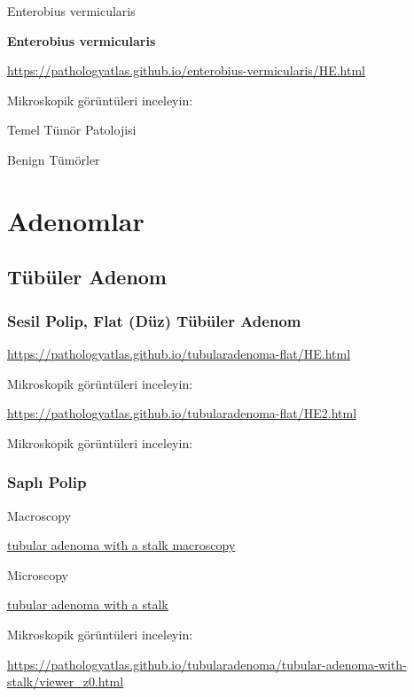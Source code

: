 \documentclass[
  letterpaper,
  DIV=11,
  numbers=noendperiod]{scrreprt}
\begin{document}
Enterobius vermicularis

\textbf{Enterobius vermicularis}

\url{https://pathologyatlas.github.io/enterobius-vermicularis/HE.html}

Mikroskopik görüntüleri inceleyin:

Temel Tümör Patolojisi

Benign Tümörler

\hypertarget{adenomlar}{%
\chapter{Adenomlar}\label{adenomlar}}

\hypertarget{tuxfcbuxfcler-adenom}{%
\section{Tübüler Adenom}\label{tuxfcbuxfcler-adenom}}

\hypertarget{sesil-polip-flat-duxfcz-tuxfcbuxfcler-adenom}{%
\subsection{Sesil Polip, Flat (Düz) Tübüler
Adenom}\label{sesil-polip-flat-duxfcz-tuxfcbuxfcler-adenom}}

\url{https://pathologyatlas.github.io/tubularadenoma-flat/HE.html}

Mikroskopik görüntüleri inceleyin:

\url{https://pathologyatlas.github.io/tubularadenoma-flat/HE2.html}

Mikroskopik görüntüleri inceleyin:

\hypertarget{saplux131-polip}{%
\subsection{Saplı Polip}\label{saplux131-polip}}

Macroscopy

\href{https://pathologyatlas.github.io/tubularadenoma/tubular-adenoma-with-stalk-macroscopy.jpg}{tubular
adenoma with a stalk macroscopy}

Microscopy

\href{https://pathologyatlas.github.io/tubularadenoma/tubular-adenoma-with-stalk.jpeg}{tubular
adenoma with a stalk}

Mikroskopik görüntüleri inceleyin:

\url{https://pathologyatlas.github.io/tubularadenoma/tubular-adenoma-with-stalk/viewer_z0.html}
\end{document}

